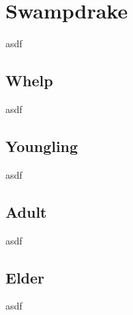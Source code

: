 \section{Swampdrake}

asdf

\subsection{Whelp}

asdf

\subsection{Youngling}

asdf

\subsection{Adult}

asdf

\subsection{Elder}

asdf